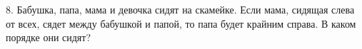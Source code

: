 8. Бабушка, папа, мама и девочка сидят на скамейке. Если мама, сидящая слева от всех, сядет между бабушкой и папой, то папа будет крайним справа. В каком порядке они сидят?\\
